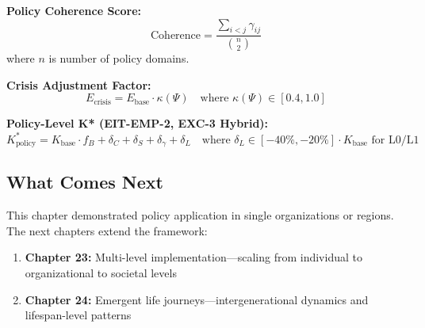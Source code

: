\textbf{Policy Coherence Score:}
\begin{equation}
\label{eq:ch22-coherence}
\text{Coherence} = \frac{\sum_{i < j} \gamma_{ij}}{\binom{n}{2}}
\end{equation}
where $n$ is number of policy domains.

\textbf{Crisis Adjustment Factor:}
\begin{equation}
\label{eq:ch22-crisis}
E_{\text{crisis}} = E_{\text{base}} \cdot \kappa(\Psi) \quad \text{where } \kappa(\Psi) \in [0.4, 1.0]
\end{equation}

\textbf{Policy-Level K* (EIT-EMP-2, EXC-3 Hybrid):}
\begin{equation}
\label{eq:ch22-k-policy}
K^*_{\text{policy}} = K_{\text{base}} \cdot f_B + \delta_C + \delta_S + \delta_\gamma + \delta_L \quad \text{where } \delta_L \in [-40\%, -20\%] \cdot K_{\text{base}} \text{ for L0/L1}
\end{equation}

\subsection{What Comes Next}
\label{sec:ch22-next}

This chapter demonstrated policy application in single organizations or regions. The next chapters extend the framework:

\begin{enumerate}[nosep]
    \item \textbf{Chapter 23:} Multi-level implementation---scaling from individual to organizational to societal levels
    \item \textbf{Chapter 24:} Emergent life journeys---intergenerational dynamics and lifespan-level patterns
\end{enumerate}


\newpage
